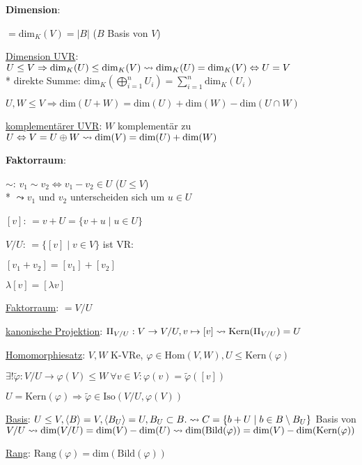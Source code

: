 \textbf{Dimension}:
\begin{items}
	\item $=\text{dim}_K(V)=|B|$ ($B$ Basis von $V$)
	\item \underline{Dimension UVR}: $U \leq V \Rightarrow \text{dim}_K(U) \leq \text{dim}_K(V) \\* \leadsto \text{dim}_K(U)=\text{dim}_K(V) \Leftrightarrow U=V$ \\* direkte Summe: $\text{dim}_K(\bigoplus_{i=1}^n U_i) = \sum_{i=1}^n \text{dim}_K(U_i)$
	\item $U,W \leq V \Rightarrow \text{dim}(U+W)=\text{dim}(U)+\text{dim}(W)-\text{dim}(U\cap W)$
	\item \underline{komplementärer UVR}: $W$ komplementär zu $U \Leftrightarrow V=U \oplus W \\* \leadsto \text{dim}(V)=\text{dim}(U)+\text{dim}(W)$
\end{items}

\newpage

\textbf{Faktorraum}:
\begin{items}
	\item \underline{$\sim$}: $v_1 \sim v_2 \Leftrightarrow v_1 - v_2 \in U$ ($U \leq V$) \\* $\leadsto v_1$ und $v_2$ unterscheiden sich um $u \in U$
	\item \underline{$[v]$}: $=v+U= \{ v+u \mid u \in U \}$
	\item \underline{$V/U$}: $=\{ [v] \mid v \in V \}$ ist VR:
	\begin{enumeration}
		\item $[v_1+v_2]=[v_1]+[v_2]$
		\item $\lambda [v] = [\lambda v]$
	\end{enumeration}
	\item \underline{Faktorraum}: $=V/U$
	\item \underline{kanonische Projektion}: $\Pi_{V/U}: V \rightarrow V/U, v \mapsto [v] \\* \leadsto \text{Kern}(\Pi_{V/U})=U$
	\item \underline{Homomorphiesatz}: $V,W$ K-VRe, $\varphi \in \text{Hom}(V,W), U \leq \text{Kern}(\varphi)$
	\begin{enumeration}
		\item $\exists ! \tilde{\varphi}: V/U \rightarrow \varphi(V) \leq W \ \forall v \in V: \varphi(v)= \tilde{\varphi}([v])$
		\item $U=\text{Kern}(\varphi) \Rightarrow \tilde{\varphi} \in \text{Iso}(V/U, \varphi(V))$
	\end{enumeration}
	\item \underline{Basis}: $U \leq V, \langle B \rangle = V, \langle B_U \rangle = U, B_U \subset B. \\* \leadsto C=\{ b+U \mid b \in B \setminus B_U \}$ Basis von $V/U \\* \leadsto \text{dim}(V/U) = \text{dim}(V)-\text{dim}(U) \\* \leadsto \text{dim}(\text{Bild}(\varphi)) = \text{dim}(V)-\text{dim}(\text{Kern}(\varphi))$
	\item \underline{Rang}: $\text{Rang}(\varphi)=\text{dim}(\text{Bild}(\varphi))$
\end{items}
